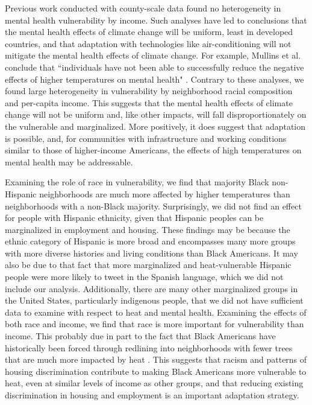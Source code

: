 \documentclass[fleqn,10pt]{wlscirep}
\begin{document}
Previous work conducted with county-scale data found no heterogeneity in mental health vulnerability by income. Such analyses have led to conclusions that the mental health effects of climate change will be uniform, least in developed countries, and that adaptation with technologies like air-conditioning will not mitigate the mental health effects of climate change. For example, Mullins et al. conclude that ``individuals have not been able to successfully reduce the negative effects of higher temperatures on mental health" \cite{Mullins2019Dec}. Contrary to these analyses, we found large heterogeneity in vulnerability by neighborhood racial composition and per-capita income. This suggests that the mental health effects of climate change will not be uniform and, like other impacts, will fall disproportionately on the vulnerable and marginalized. More positively, it does suggest that adaptation is possible, and, for communities with infrastructure and working conditions similar to those of higher-income Americans, the effects of high temperatures on mental health may be addressable.

Examining the role of race in vulnerability, we find that majority Black non-Hispanic neighborhoods are much more affected by higher temperatures than neighborhoods with a non-Black majority. Surprisingly, we did not find an effect for people with Hispanic ethnicity, given that Hispanic peoples can be marginalized in employment and housing. These findings may be because the ethnic category of Hispanic is more broad and encompasses many more groups with more diverse histories and living conditions than Black Americans. It may also be due to that fact that more marginalized and heat-vulnerable Hispanic people were more likely to tweet in the Spanish language, which we did not include our analysis. Additionally, there are many other marginalized groups in the United States, particularly indigenous people, that we did not have sufficient data to examine with respect to heat and mental health. Examining the effects of both race and income, we find that race is more important for vulnerability than income. This probably due in part to the fact that Black Americans have historically been forced through redlining into neighborhoods with fewer trees that are much more impacted by heat \cite{Hoffman2020, Locke2021}.  This suggests that racism and patterns of housing discrimination contribute to making Black Americans more vulnerable to heat, even at similar levels of income as other groups, and that reducing existing discrimination in housing and employment is an important adaptation strategy.
\end{document}
